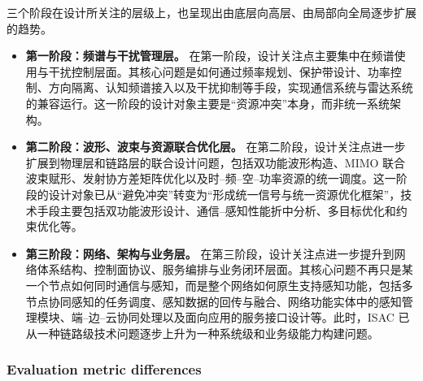 三个阶段在设计所关注的层级上，也呈现出由底层向高层、由局部向全局逐步扩展的趋势。
\begin{itemize}
    \item \textbf{第一阶段：频谱与干扰管理层。}  
    在第一阶段，设计关注点主要集中在频谱使用与干扰控制层面。其核心问题是如何通过频率规划、保护带设计、功率控制、方向隔离、认知频谱接入以及干扰抑制等手段，实现通信系统与雷达系统的兼容运行\cite{Chiriyath2017RadarCommCoexistence,Blunt2018RadarSpectrumSharing}。这一阶段的设计对象主要是“资源冲突”本身，而非统一系统架构。
    \item \textbf{第二阶段：波形、波束与资源联合优化层。}  
    在第二阶段，设计关注点进一步扩展到物理层和链路层的联合设计问题，包括双功能波形构造、MIMO 联合波束赋形、发射协方差矩阵优化以及时--频--空--功率资源的统一调度\cite{Liu2020JointRadarComm,Zhang2021ISAC6G,Sturm2011WaveformDesign}。这一阶段的设计对象已从“避免冲突”转变为“形成统一信号与统一资源优化框架”，技术手段主要包括双功能波形设计、通信--感知性能折中分析、多目标优化和约束优化等。
    \item \textbf{第三阶段：网络、架构与业务层。}  
    在第三阶段，设计关注点进一步提升到网络体系结构、控制面协议、服务编排与业务闭环层面\cite{Gonzalez2024integrated,Zhang2020perceptive,Cui2024integrated}。其核心问题不再只是某一个节点如何同时通信与感知，而是整个网络如何原生支持感知功能，包括多节点协同感知的任务调度、感知数据的回传与融合、网络功能实体中的感知管理模块、端--边--云协同处理以及面向应用的服务接口设计等。此时，ISAC 已从一种链路级技术问题逐步上升为一种系统级和业务级能力构建问题。
\end{itemize}

\subsubsection{Evaluation metric differences}
\label{subsubsec:ch1-metric-differences}

